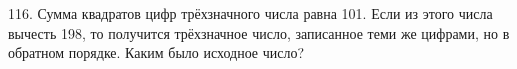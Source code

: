 116. Сумма квадратов цифр трёхзначного числа равна 101. Если из этого числа вычесть 198, то получится трёхзначное число, записанное теми же цифрами, но в обратном порядке. Каким было исходное число?\\
